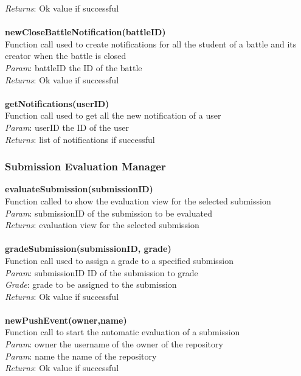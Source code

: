 \documentclass{article}
\begin{document}
\textit{Returns}: Ok value if successful\\
\\
\textbf{newCloseBattleNotification(battleID)}\\
Function call used to create notifications for all the student of a battle and its creator when the battle is closed\\
\textit{Param}: battleID the ID of the battle\\
\textit{Returns}: Ok value if successful\\
\\
\textbf{getNotifications(userID)}\\
Function call used to get all the new notification of a user\\
\textit{Param}: userID the ID of the user\\
\textit{Returns}: list of notifications if successful\\

\subsubsection{Submission Evaluation Manager}
\textbf{evaluateSubmission(submissionID)}\\
Function called to show the evaluation view for the selected submission\\
\textit{Param}: submissionID of the submission to be evaluated\\
\textit{Returns}: evaluation view for the selected submission\\
\\
\textbf{gradeSubmission(submissionID, grade)}\\
Function call used to assign a grade to a specified submission\\
\textit{Param}: submissionID ID of the submission to grade\\
\textit{Grade}: grade to be assigned to the submission\\
\textit{Returns}: Ok value if successful\\
\\
\textbf{newPushEvent(owner,name)}\\
Function call to start the automatic evaluation of a submission\\
\textit{Param}: owner the username of the owner of the repository\\
\textit{Param}: name the name of the repository\\
\textit{Returns}: Ok value if successful\\
\end{document}
